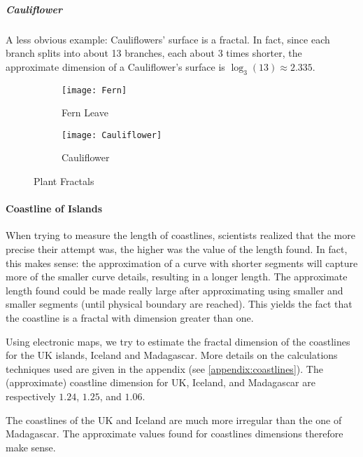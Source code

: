 \subparagraph{Cauliflower}
A less obvious example: Cauliflowers' surface is a fractal.
In fact, since each branch splits into about 13 branches, each about 3 times shorter, the approximate dimension of a Cauliflower's surface is $\log_3(13) \approx 2.335$.

\begin{figure}[!h]
	\centering
	\begin{subfigure}{.49\textwidth}
		\texttt{[image: Fern]}
		\centering
		\captionsetup{justification=centering}
		\caption{Fern Leave}
		\label{fig:fern}
	\end{subfigure}
	\begin{subfigure}{.49\textwidth}
		\texttt{[image: Cauliflower]}
		\centering
		\captionsetup{justification=centering}
		\caption{Cauliflower}
		\label{fig:cauliflower}
	\end{subfigure}
	\caption{Plant Fractals}
	\label{fig:plantsFractals}
\end{figure}

\paragraph{Coastline of Islands}
When trying to measure the length of coastlines, scientists realized that the more precise their attempt was, the higher was the value of the length found.
In fact, this makes sense: the approximation of a curve with shorter segments will capture more of the smaller curve details, resulting in a longer length.
The approximate length found could be made really large after approximating using smaller and smaller segments (until physical boundary are reached).
This yields the fact that the coastline is a fractal with dimension greater than one.

Using electronic maps, we try to estimate the fractal dimension of the coastlines for the UK islands, Iceland and Madagascar.
More details on the calculations techniques used are given in the appendix (see \ref{appendix:coastlines}).
The (approximate) coastline dimension for UK, Iceland, and Madagascar are respectively $1.24$, $1.25$, and $1.06$.

The coastlines of the UK and Iceland are much more irregular than the one of Madagascar.
The approximate values found for coastlines dimensions therefore make sense.
